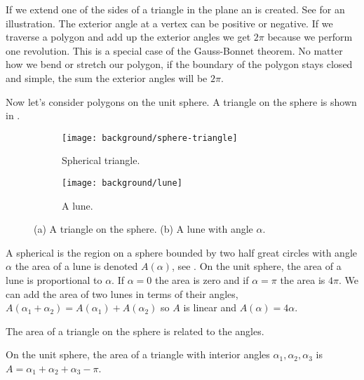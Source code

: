 If we extend one of the sides of a triangle in the plane
an  is created. See 
for an illustration.
The exterior angle at a vertex can be positive or negative.
If we traverse a polygon and add up the exterior angles
we get $2\pi$ because we perform one revolution.
This is a special case of the Gauss-Bonnet theorem.
No matter how we bend or stretch our polygon,
if the boundary of the polygon stays closed and simple,
the sum the exterior angles will be $2\pi$.






Now let's consider polygons on the unit sphere.
A triangle on the sphere is shown in .



 \begin{figure}[htb]
         \centering
        \begin{subfigure}[b]{0.35\textwidth}
         \texttt{[image: background/sphere-triangle]}
         \caption{Spherical triangle.}
 	 \label{fig:sphere-triangle}
       \end{subfigure}
         \hspace{1cm}
         \begin{subfigure}[b]{0.35\textwidth}
         \texttt{[image: background/lune]}
         \caption{A lune.}
          \label{fig:lune}
         \end{subfigure}
		\caption{(a) A triangle on the sphere.
 		(b) A lune with angle $\alpha$.
 		\label{fig:sphere-lune}}
 \end{figure}
A spherical  is the region on a sphere bounded by two half great circles
with angle $\alpha$ the area of a lune is denoted $A(\alpha)$,
 see .
On the unit sphere, the area of a lune is proportional to $\alpha$. 
If $\alpha=0$ the area is zero and if $\alpha=\pi$ the area is $4\pi$.
We can add the area of two lunes in terms of their angles, 
$A(\alpha_1+\alpha_2)=A(\alpha_1)+A(\alpha_2)$ so $A$ is linear
and  $A(\alpha)=4\alpha.$




The area of a triangle on the sphere is related to the angles.

\begin{lemma}\label{lem:spherical-triangle}
On the unit sphere, the area of a triangle with interior angles $\alpha_1, \alpha_2, \alpha_3$
is $A=\alpha_1+\alpha_2+\alpha_3-\pi$.
\end{lemma}

